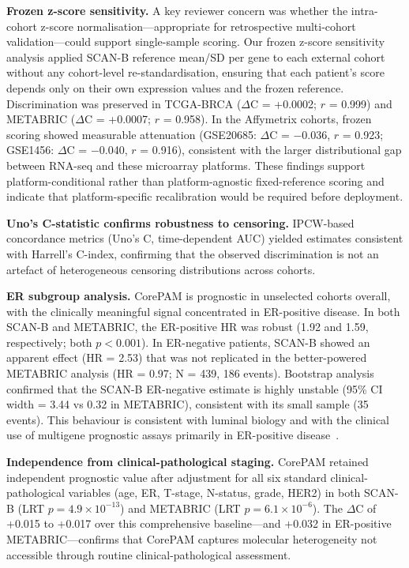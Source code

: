 \documentclass[referee,lineno,pdflatex,sn-vancouver-num]{sn-jnl}
\begin{document}
\textbf{Frozen z-score sensitivity.} A key reviewer concern was whether the intra-cohort z-score normalisation---appropriate for retrospective multi-cohort validation---could support single-sample scoring. Our frozen z-score sensitivity analysis applied SCAN-B reference mean/SD per gene to each external cohort without any cohort-level re-standardisation, ensuring that each patient's score depends only on their own expression values and the frozen reference. Discrimination was preserved in TCGA-BRCA ($\Delta$C = +0.0002; $r$ = 0.999) and METABRIC ($\Delta$C = +0.0007; $r$ = 0.958). In the Affymetrix cohorts, frozen scoring showed measurable attenuation (GSE20685: $\Delta$C = $-$0.036, $r$ = 0.923; GSE1456: $\Delta$C = $-$0.040, $r$ = 0.916), consistent with the larger distributional gap between RNA-seq and these microarray platforms. These findings support platform-conditional rather than platform-agnostic fixed-reference scoring and indicate that platform-specific recalibration would be required before deployment.

\textbf{Uno's C-statistic confirms robustness to censoring.} IPCW-based concordance metrics (Uno's C, time-dependent AUC) yielded estimates consistent with Harrell's C-index, confirming that the observed discrimination is not an artefact of heterogeneous censoring distributions across cohorts.

\textbf{ER subgroup analysis.} CorePAM is prognostic in unselected cohorts overall, with the clinically meaningful signal concentrated in ER-positive disease. In both SCAN-B and METABRIC, the ER-positive HR was robust (1.92 and 1.59, respectively; both $p < 0.001$). In ER-negative patients, SCAN-B showed an apparent effect (HR = 2.53) that was not replicated in the better-powered METABRIC analysis (HR = 0.97; N = 439, 186 events). Bootstrap analysis confirmed that the SCAN-B ER-negative estimate is highly unstable (95\% CI width = 3.44 vs 0.32 in METABRIC), consistent with its small sample (35 events). This behaviour is consistent with luminal biology and with the clinical use of multigene prognostic assays primarily in ER-positive disease~\cite{sparano2018,dowsett2013}.

\textbf{Independence from clinical-pathological staging.} CorePAM retained independent prognostic value after adjustment for all six standard clinical-pathological variables (age, ER, T-stage, N-status, grade, HER2) in both SCAN-B (LRT $p = 4.9 \times 10^{-13}$) and METABRIC (LRT $p = 6.1 \times 10^{-6}$). The $\Delta$C of +0.015 to +0.017 over this comprehensive baseline---and +0.032 in ER-positive METABRIC---confirms that CorePAM captures molecular heterogeneity not accessible through routine clinical-pathological assessment.
\end{document}
